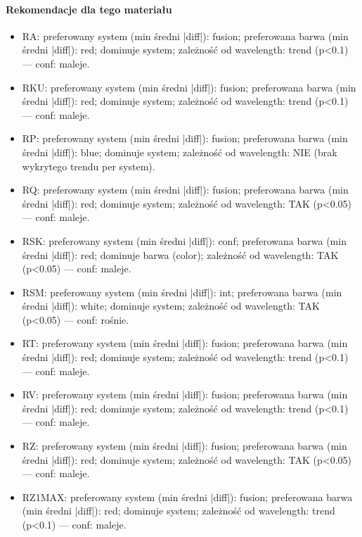 \documentclass[
  10pt,
]{article}
\begin{document}
\paragraph{Rekomendacje dla tego materiału}
\begin{itemize}
\item RA: preferowany system (min średni |diff|): fusion; preferowana barwa (min średni |diff|): red; dominuje system; zależność od wavelength: trend (p<0.1) — conf: maleje.
\item RKU: preferowany system (min średni |diff|): fusion; preferowana barwa (min średni |diff|): red; dominuje system; zależność od wavelength: trend (p<0.1) — conf: maleje.
\item RP: preferowany system (min średni |diff|): fusion; preferowana barwa (min średni |diff|): blue; dominuje system; zależność od wavelength: NIE (brak wykrytego trendu per system).
\item RQ: preferowany system (min średni |diff|): fusion; preferowana barwa (min średni |diff|): red; dominuje system; zależność od wavelength: TAK (p<0.05) — conf: maleje.
\item RSK: preferowany system (min średni |diff|): conf; preferowana barwa (min średni |diff|): red; dominuje barwa (color); zależność od wavelength: TAK (p<0.05) — conf: maleje.
\item RSM: preferowany system (min średni |diff|): int; preferowana barwa (min średni |diff|): white; dominuje system; zależność od wavelength: TAK (p<0.05) — conf: rośnie.
\item RT: preferowany system (min średni |diff|): fusion; preferowana barwa (min średni |diff|): red; dominuje system; zależność od wavelength: trend (p<0.1) — conf: maleje.
\item RV: preferowany system (min średni |diff|): fusion; preferowana barwa (min średni |diff|): red; dominuje system; zależność od wavelength: trend (p<0.1) — conf: maleje.
\item RZ: preferowany system (min średni |diff|): fusion; preferowana barwa (min średni |diff|): red; dominuje system; zależność od wavelength: TAK (p<0.05) — conf: maleje.
\item RZ1MAX: preferowany system (min średni |diff|): fusion; preferowana barwa (min średni |diff|): red; dominuje system; zależność od wavelength: trend (p<0.1) — conf: maleje.
\end{itemize}
\end{document}
